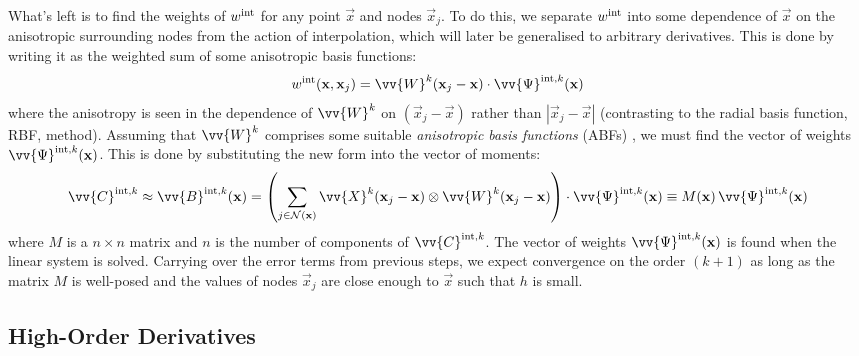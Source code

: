 What's left is to find the weights of $w^{\rm{int}}$ for any point $\vec{x}$ and nodes $\vec{x}_j$. To do this, we separate $w^{\rm{int}}$ into some dependence of $\vec{x}$ on the anisotropic surrounding nodes from the action of interpolation, which will later be generalised to arbitrary derivatives. This is done by writing it as the weighted sum of some anisotropic basis functions:
\begin{equation}
w^{\rm{int}}(\vec{x}, \vec{x}_j) = \vv{W}^k(\vec{x}_j - \vec{x}) \cdot \vv{\Psi}^{\rm{int}, k}(\vec{x})
\end{equation}
where the anisotropy is seen in the dependence of $\vv{W}^k$ on $(\vec{x}_j - \vec{x})$ rather than $|\vec{x}_j - \vec{x}|$ (contrasting to the radial basis function, RBF, method). Assuming that $\vv{W}^k$ comprises some suitable \emph{anisotropic basis functions} (ABFs) \cite{king2022HighorderSimulationsIsothermal}, we must find the vector of weights $\vv{\Psi}^{\rm{int}, k}(\vec{x})$. This is done by substituting the new form into the vector of moments:
\begin{align}
\vv{C}^{\rm{int}, k}
\approx \vv{B}^{\rm{int}, k}(\vec{x})
= \left( \sum_{j \in \cl{N}(\vec{x})} \vv{X}^k (\vec{x}_j - \vec{x}) \otimes \vv{W}^k(\vec{x}_j - \vec{x}) \right) \cdot \vv{\Psi}^{\rm{int}, k}(\vec{x})
\equiv M(\vec{x}) \, \vv{\Psi}^{\rm{int}, k}(\vec{x})
\end{align}
where $M$ is a $n \times n$ matrix and $n$ is the number of components of $\vv{C}^{\rm{int}, k}$. The vector of weights $\vv{\Psi}^{\rm{int}, k}(\vec{x})$ is found when the linear system is solved. Carrying over the error terms from previous steps, we expect convergence on the order $(k + 1)$ as long as the matrix $M$ is well-posed and the values of nodes $\vec{x}_j$ are close enough to $\vec{x}$ such that $h$ is small.


\subsection{High-Order Derivatives}

